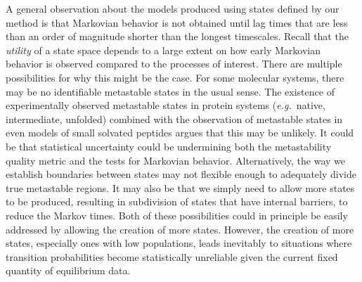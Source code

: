 A general observation about the models produced using states defined by our method is that Markovian behavior is not obtained until lag times that are less than an order of magnitude shorter than the longest timescales.
Recall that the {\em utility} of a state space depends to a large extent on how early Markovian behavior is observed compared to the processes of interest.
There are multiple possibilities for why this might be the case.
For some molecular systems, there may be no identifiable metastable states in the usual sense.  
The existence of experimentally observed metastable states in protein systems (\emph{e.g.}\ native, intermediate, unfolded) combined with the observation of metastable states in even models of small solvated peptides \cite{chodera:mms:2006} argues that this may be unlikely.
It could be that statistical uncertainty could be undermining both the metastability quality metric and the tests for Markovian behavior.
Alternatively, the way we establish boundaries between states may not flexible enough to adequately divide true metastable regions.  
It may also be that we simply need to allow more states to be produced, resulting in subdivision of states that have internal barriers, to reduce the Markov times. 
Both of these possibilities could in principle be easily addressed by allowing the creation of more states.
However, the creation of more states, especially ones with low populations, leads inevitably to situations where transition probabilities become statistically unreliable given the current fixed quantity of equilibrium data.  


